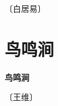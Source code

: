 \documentclass[12pt,UTF-8,openany,fontset=none]{ctexbook}
\begin{document}
\begin{center}
    \vspace{10pt}
    
    \begin{large}
        
        〔白居易〕
        
    \end{large}
    
    \vspace{8pt}
    
    \begin{huge}
        
        \phantom{。}

        \phantom{。}
        
        \phantom{。}

        \phantom{。}
        
    \end{huge}
    
\end{center}

\vspace{8pt}
\clearpage


\section{鸟鸣涧}



\begin{center}
    {\bfseries 鸟鸣涧}
\end{center}

\begin{center}
    \vspace{10pt}
    
    \begin{large}
        
        〔王维〕
        
    \end{large}
    
    \vspace{8pt}
    
    \begin{huge}
        
        \phantom{。}

        \phantom{。}
        
        \phantom{。}

        \phantom{。}
        
    \end{huge}
    
\end{center}
\end{document}
